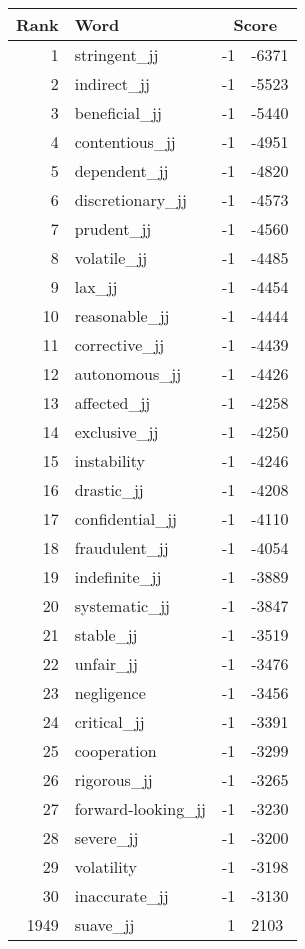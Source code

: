 \begin{longtable}[!htbp]{| rlr@{.}l |}
    \hline
    \textbf{Rank} & \textbf{Word} & \multicolumn{2}{c|}{\textbf{Score}} \\
    \hline
    \endhead
    1 & stringent\_jj & -1 & -6371 \\
    2 & indirect\_jj & -1 & -5523 \\
    3 & beneficial\_jj & -1 & -5440 \\
    4 & contentious\_jj & -1 & -4951 \\
    5 & dependent\_jj & -1 & -4820 \\
    6 & discretionary\_jj & -1 & -4573 \\
    7 & prudent\_jj & -1 & -4560 \\
    8 & volatile\_jj & -1 & -4485 \\
    9 & lax\_jj & -1 & -4454 \\
    10 & reasonable\_jj & -1 & -4444 \\
    11 & corrective\_jj & -1 & -4439 \\
    12 & autonomous\_jj & -1 & -4426 \\
    13 & affected\_jj & -1 & -4258 \\
    14 & exclusive\_jj & -1 & -4250 \\
    15 & instability & -1 & -4246 \\
    16 & drastic\_jj & -1 & -4208 \\
    17 & confidential\_jj & -1 & -4110 \\
    18 & fraudulent\_jj & -1 & -4054 \\
    19 & indefinite\_jj & -1 & -3889 \\
    20 & systematic\_jj & -1 & -3847 \\
    21 & stable\_jj & -1 & -3519 \\
    22 & unfair\_jj & -1 & -3476 \\
    23 & negligence & -1 & -3456 \\
    24 & critical\_jj & -1 & -3391 \\
    25 & cooperation & -1 & -3299 \\
    26 & rigorous\_jj & -1 & -3265 \\
    27 & forward-looking\_jj & -1 & -3230 \\
    28 & severe\_jj & -1 & -3200 \\
    29 & volatility & -1 & -3198 \\
    30 & inaccurate\_jj & -1 & -3130 \\
    1949 & suave\_jj & 1 & 2103 \\

\end{longtable}
